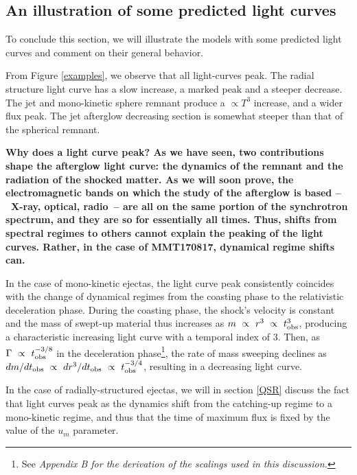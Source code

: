 \subsection{An illustration of some predicted light curves}
To conclude this section, we will illustrate the models with some predicted light curves and comment on their general behavior.


From Figure \ref{examples}, we observe that all light-curves peak. The radial structure light curve has a slow increase, a marked peak and a steeper decrease. The jet and mono-kinetic sphere remnant produce a $\propto T^3$ increase, and a wider flux peak. The jet afterglow decreasing section is somewhat steeper than that of the spherical remnant.

\bf{Why does a light curve peak? }As we have seen, two contributions shape the afterglow light curve: the dynamics of the remnant and the radiation of the shocked matter. As we will soon prove, the electromagnetic bands on which the study of the afterglow is based --~X-ray, optical, radio~-- are all on the same portion of the synchrotron spectrum, and they are so for essentially all times. Thus, shifts from spectral regimes to others cannot explain the peaking of the light curves. Rather, in the case of MMT170817, dynamical regime shifts can.

In the case of mono-kinetic ejectas, the light curve peak consistently coincides with the change of dynamical regimes from the coasting phase to the relativistic deceleration phase. During the coasting phase, the shock's velocity is constant and the mass of swept-up material thus increases as $m~\propto~r^3~\propto~t_{\mathrm{obs}}^3$, producing a characteristic increasing light curve with a temporal index of $3$. Then, as $\Gamma~\propto~t_{\mathrm{obs}}^{-3/8}$ in the deceleration phase\footnote{See \it{Appendix B} for the derivation of the scalings used in this discussion.}, the rate of mass sweeping declines as $dm/dt_{\mathrm{obs}}~\propto~dr^3/dt_{\mathrm{obs}}~\propto~t_{\mathrm{obs}}^{-3/4}$, resulting in a decreasing light curve.


In the case of radially-structured ejectas, we will in section \ref{QSR} discuss the fact that light curves peak as the dynamics shift from the catching-up regime to a mono-kinetic regime, and thus that the time of maximum flux is fixed by the value of the $u_m$ parameter.


